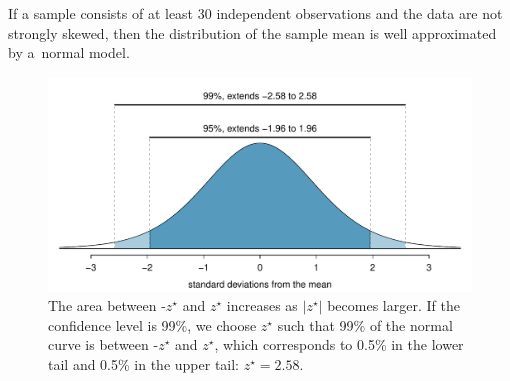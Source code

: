 




\begin{termBox}{
If a sample consists of at least 30 independent observations and the data are not strongly skewed, then the distribution of the sample mean is well approximated by a~normal model.}
\end{termBox}






\begin{figure}%
\centering
\includegraphics[width=\textwidth]{ch_inference_foundations/figures/choosingZForCI/choosingZForCI}
\caption{The area between -$z^{\star}$ and $z^{\star}$ increases as $|z^{\star}|$ becomes larger. If the confidence level is 99\%, we choose $z^{\star}$ such that 99\% of the normal curve is between -$z^{\star}$ and $z^{\star}$, which corresponds to 0.5\% in the lower tail and 0.5\% in the upper tail: $z^{\star}=2.58$.}
\label{choosingZForCI}
\end{figure}

